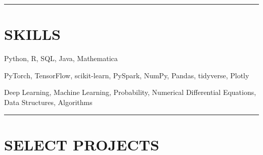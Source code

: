 \documentclass{simplecv}
\begin{document}
\rule{10cm}{0.5pt}

\vspace{-0.4cm}


\section{SKILLS}
 Python, R, SQL, Java, Mathematica

 PyTorch, TensorFlow, scikit-learn, PySpark, NumPy, Pandas, tidyverse, Plotly

 Deep Learning, Machine Learning, Probability, Numerical Differential Equations, Data Structures, Algorithms

\vspace{-0.2cm}

\rule{10cm}{0.5pt}

\vspace{-0.4cm}

\section{SELECT PROJECTS}
\end{document}
